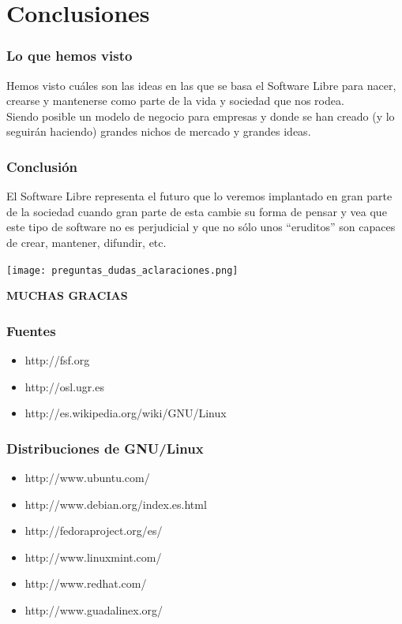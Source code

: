 \documentclass{beamer}
\begin{document}
	\section{Conclusiones}
		\begin{frame}
			\frametitle{Lo que hemos visto}
			Hemos visto cuáles son las ideas en las que se basa el Software Libre para nacer, crearse y mantenerse como parte de la vida y sociedad
			que nos rodea.
			\\
			Siendo posible un modelo de negocio para empresas y donde se han creado (y lo seguirán haciendo) grandes nichos de mercado y grandes ideas.
		\end{frame}
		\begin{frame}
			\frametitle{Conclusión}
			El Software Libre representa el futuro que lo veremos implantado en gran parte de la sociedad cuando gran parte de esta cambie 
			su forma de pensar y vea que este tipo de software no es perjudicial y que no sólo unos ``eruditos'' son capaces de crear, mantener,
			difundir, etc.
		\end{frame}
		\begin{frame}
			\begin{center}
				\texttt{[image: preguntas\_dudas\_aclaraciones.png]}
			\end{center}
		\end{frame}
		\begin{frame}
			\begin{center}
				\Huge{\textbf{MUCHAS GRACIAS}}
			\end{center}
		\end{frame}


	\begin{frame}
		\frametitle{Fuentes}
		\begin{itemize}
			\item http://fsf.org
			\item http://osl.ugr.es
			\item http://es.wikipedia.org/wiki/GNU/Linux
		\end{itemize}
	\end{frame}


	\begin{frame}
		\frametitle{Distribuciones de GNU/Linux}
		\begin{itemize}
			\item http://www.ubuntu.com/
			\item http://www.debian.org/index.es.html
			\item http://fedoraproject.org/es/
			\item http://www.linuxmint.com/
			\item http://www.redhat.com/
			\item http://www.guadalinex.org/
		\end{itemize}
	\end{frame}
\end{document}
